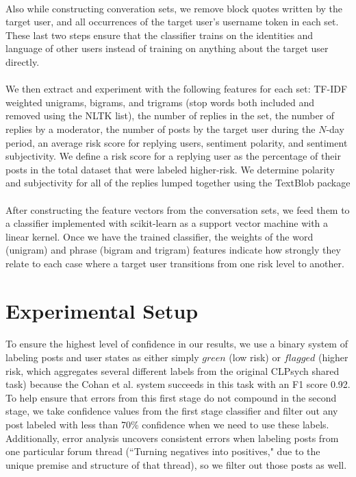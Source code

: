 \documentclass{article}
\begin{document}
\paragraph{}Also while constructing converation sets, we remove block quotes written by the target user, and all occurrences of the target user's username token in each set. These last two steps ensure that the classifier trains on the identities and language of other users instead of training on anything about the target user directly.

\paragraph{}We then extract and experiment with the following features for each set: TF-IDF weighted unigrams, bigrams, and trigrams (stop words both included and removed using the NLTK list), the number of replies in the set, the number of replies by a moderator, the number of posts by the target user during the $N$-day period, an average risk score for replying users, sentiment polarity, and sentiment subjectivity. We define a risk score for a replying user as the percentage of their posts in the total dataset that were labeled higher-risk. We determine polarity and subjectivity for all of the replies lumped together using the TextBlob package\cite{textblob}

\paragraph{}After constructing the feature vectors from the conversation sets, we feed them to a classifier implemented with scikit-learn as a support vector machine with a linear kernel. Once we have the trained classifier, the weights of the word (unigram) and phrase (bigram and trigram) features indicate how strongly they relate to each case where a target user transitions from one risk level to another.

\section{Experimental Setup}

\paragraph{}To ensure the highest level of confidence in our results, we use a binary system of labeling posts and user states as either simply $green$ (low risk) or $flagged$ (higher risk, which aggregates several different labels from the original CLPsych shared task) because the Cohan et al. system succeeds in this task with an F1 score 0.92. To help ensure that errors from this first stage do not compound in the second stage, we take confidence values from the first stage classifier and filter out any post labeled with less than 70\% confidence when we need to use these labels. Additionally, error analysis uncovers consistent errors when labeling posts from one particular forum thread (``Turning negatives into positives," due to the unique premise and structure of that thread), so we filter out those posts as well.
\end{document}
